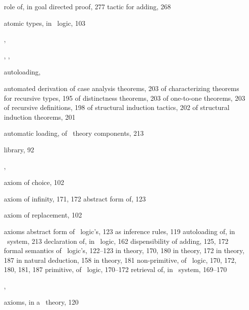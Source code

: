 \begin{theindex}
    \subitem role of, in goal directed proof, 277
    \subitem tactic for adding, 268
  \item atomic types, in \HOL\ logic, 103
  \item {}, 
  \item {}, , 
  \item autoloading, 
  \item automated derivation
    \subitem of case analysis theorems, 203
    \subitem of characterizing theorems for recursive types, 195
    \subitem of distinctness theorems, 203
    \subitem of one-to-one theorems, 203
    \subitem of recursive definitions, 198
    \subitem of structural induction tactics, 202
    \subitem of structural induction theorems, 201
  \item automatic loading, of \HOL\ theory components, 213
  \item {} library, 92
  \item {}, 
  \item axiom of choice, 102
  \item axiom of infinity, 171, 172
    \subitem abstract form of, 123
  \item axiom of replacement, 102
  \item axioms
    \subitem abstract form of \HOL\ logic's, 123
    \subitem as inference rules, 119
    \subitem autoloading of, in \HOL\ system, 213
    \subitem declaration of, in \HOL\ logic, 162
    \subitem dispensibility of adding, 125, 172
    \subitem formal semantics of \HOL\ logic's, 122--123
    \subitem in  theory, 170, 180
    \subitem in  theory, 172
    \subitem in  theory, 187
    \subitem in natural deduction, 158
    \subitem in  theory, 181
    \subitem non-primitive, of \HOL\ logic, 170, 172, 180, 181, 187
    \subitem primitive, of \HOL\ logic, 170--172
    \subitem retrieval of, in \HOL\ system, 169--170
  \item {}, 
  \item axioms, in a \HOL\ theory, 120

  \indexspace


\end{theindex}
